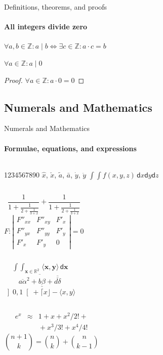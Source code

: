 \documentclass{beamer}
\begin{document}
	\begin{frame}[label=proof]{Definitions, theorems, and proofs}
		\framesubtitle{All integers divide zero}
		\begin{definition}
			$\forall a,b\in\mathds{Z}: a\mid b\iff\exists c\in\mathds{Z}:a\cdot c=b$
		\end{definition}
		\begin{theorem}
			$\forall a\in\mathds{Z}: a\mid 0$
		\end{theorem}
		\begin{proof}[Proof\nopunct]
			$\forall a\in\mathds{Z}: a\cdot 0=0$
		\end{proof}
	\end{frame}

	\subsection{Numerals and Mathematics}
	\begin{frame}[label=math]{Numerals and Mathematics}
		\framesubtitle{Formulae, equations, and expressions}
		\begin{columns}[onlytextwidth]
			1234567890
			$\hat{x}$, $\check{x}$, $\tilde{a}$,
			$\bar{a}$, $\dot{y}$, $\ddot{y}$
			$\int \!\! \int f(x,y,z)\,\mathsf{d}x\mathsf{d}y\mathsf{d}z$
		\end{columns}
		\begin{columns}[onlytextwidth]
			$$\frac{1}{\displaystyle 1+
			\frac{1}{\displaystyle 2+
			\frac{1}{\displaystyle 3+x}}} +
			\frac{1}{1+\frac{1}{2+\frac{1}{3+x}}}$$
			$$F:\left| \begin{array}{ccc}
				F''_{xx} & F''_{xy} &  F'_x \\
				F''_{yx} & F''_{yy} &  F'_y \\
				F'_x     & F'_y     & 0
			\end{array}\right| = 0$$
		\end{columns}
		\begin{columns}[onlytextwidth]
			$$\mathop{\int \!\!\! \int}_{\mathbf{x} \in \mathds{R}^2}
			\! \langle \mathbf{x},\mathbf{y}\rangle\,\mathsf{d}\mathbf{x}$$
			$$\overline{\overline{a\alpha}^2+\underline{b\beta}
			+\overline{\overline{d\delta}}}$$
			$\left] 0,1\right[ + \lceil x \rfloor - \langle x,y\rangle$
		\end{columns}
		\begin{columns}[onlytextwidth]
			\begin{eqnarray*}
				e^x &\approx& 1+x+x^2/2! + \\
				&& {}+x^3/3! + x^4/4!
			\end{eqnarray*}
			$${n+1\choose k} = {n\choose k} + {n \choose k-1}$$
		\end{columns}
	\end{frame}
\end{document}
